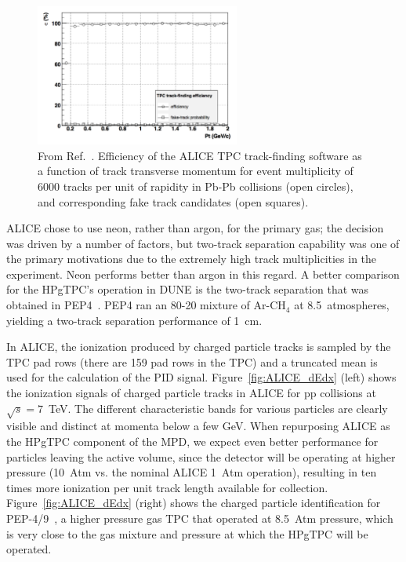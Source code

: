 \begin{figure}[h]
    \centering
    \includegraphics[width=0.6\textwidth]{graphics/ALICE_TPCreco.png}
    \caption{From Ref.~\cite{Alessandro:2006yt}. Efficiency of the ALICE TPC track-finding software as a function of track transverse momentum for event multiplicity of 6000 tracks per unit of rapidity in Pb-Pb collisions (open circles), and corresponding fake track candidates (open squares).}     
    \label{fig:ALICE_offlinereco} 
\end{figure}

ALICE chose to use neon, rather than argon, for the primary gas; the decision was driven by a number of factors, but two-track separation capability was one of the primary motivations due to the extremely high track multiplicities in the experiment.  Neon performs better than argon in this regard.  A better comparison for the HPgTPC's operation in DUNE is the two-track separation that was obtained in PEP4~\cite{PEP4_Stork}.  PEP4 ran an 80-20 mixture of Ar-CH$_4$ at 8.5~atmospheres, yielding a two-track separation performance of 1~cm.

In ALICE, the ionization produced by charged particle tracks is sampled by the TPC pad rows (there are 159 pad rows in the TPC) and a truncated mean is used for the calculation of the PID signal. Figure~\ref{fig:ALICE_dEdx} (left) shows the ionization signals of charged particle tracks in ALICE for pp collisions at $\sqrt{s} = 7$~TeV. The different characteristic bands for various particles are clearly visible and distinct at momenta below a few GeV.  When repurposing ALICE as the HPgTPC component of the MPD, we expect even better performance for particles leaving the active volume, since the detector will be operating at higher pressure (10~Atm vs. the nominal ALICE 1~Atm operation), resulting in ten times more ionization per unit track length available for collection. Figure~\ref{fig:ALICE_dEdx} (right) shows the charged particle identification for PEP-4/9~\cite{Grupen:1999by}, a higher pressure gas TPC that operated at 8.5~Atm pressure, which is very close to the gas mixture and pressure at which the HPgTPC will be operated.

